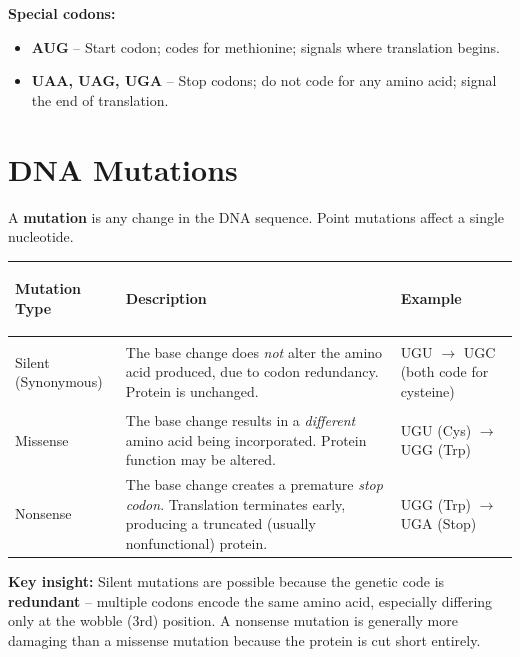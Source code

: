 \documentclass[11pt, letterpaper]{article}
\begin{document}
\vspace{4pt}
\textbf{Special codons:}
\begin{itemize}[noitemsep]
  \item \textbf{AUG} -- Start codon; codes for methionine; signals where translation begins.
  \item \textbf{UAA, UAG, UGA} -- Stop codons; do not code for any amino acid; signal the end of translation.
\end{itemize}

\section*{DNA Mutations}

A \textbf{mutation} is any change in the DNA sequence. Point mutations affect a single nucleotide.

\noindent
{\setlength{\tabcolsep}{5pt}
\renewcommand{\arraystretch}{1.5}
\begin{tabularx}{\textwidth}{>{\bfseries\raggedright\arraybackslash}p{3.2cm}>{\raggedright\arraybackslash}X>{\raggedright\arraybackslash}p{4.5cm}}
\toprule
\rowcolor{tableheader}
\textbf{Mutation Type} & \textbf{Description} & \textbf{Example} \\
\midrule
\rowcolor{rowA}
Silent (Synonymous)
  & The base change does \emph{not} alter the amino acid produced, due to codon redundancy. Protein is unchanged.
  & UGU $\to$ UGC (both code for cysteine) \\
\rowcolor{rowB}
Missense
  & The base change results in a \emph{different} amino acid being incorporated. Protein function may be altered.
  & UGU (Cys) $\to$ UGG (Trp) \\
\rowcolor{rowA}
Nonsense
  & The base change creates a premature \emph{stop codon}. Translation terminates early, producing a truncated (usually nonfunctional) protein.
  & UGG (Trp) $\to$ UGA (Stop) \\
\bottomrule
\end{tabularx}}

\vspace{6pt}
\begin{tcolorbox}[colback=rowB, colframe=sectionblue, arc=3pt, boxrule=1pt]
\textbf{Key insight:} Silent mutations are possible because the genetic code is \textbf{redundant} -- multiple codons encode the same amino acid, especially differing only at the wobble (3rd) position. A nonsense mutation is generally more damaging than a missense mutation because the protein is cut short entirely.
\end{tcolorbox}
\end{document}
